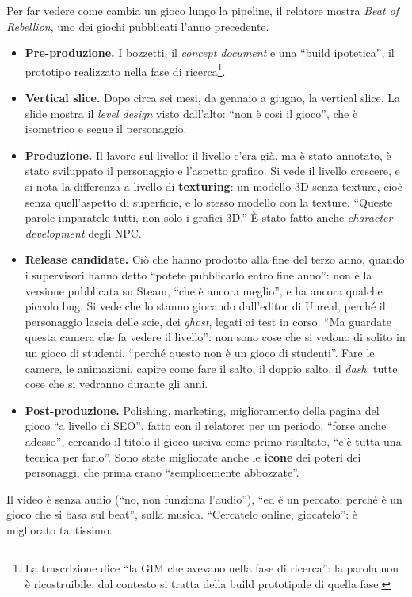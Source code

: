 Per far vedere come cambia un gioco lungo la pipeline, il relatore mostra
\emph{Beat of Rebellion}, uno dei giochi pubblicati l'anno precedente.
\begin{itemize}
  \item \textbf{Pre-produzione.} I bozzetti, il \emph{concept document} e
        una ``build ipotetica'', il prototipo realizzato nella fase di
        ricerca\footnote{La trascrizione dice ``la GIM che avevano nella fase
        di ricerca'': la parola non è ricostruibile; dal contesto si tratta
        della build prototipale di quella fase.}.
  \item \textbf{Vertical slice.} Dopo circa sei mesi, da gennaio a giugno,
        la vertical slice. La slide mostra il \emph{level design} visto
        dall'alto: ``non è così il gioco'', che è isometrico e segue il
        personaggio.
  \item \textbf{Produzione.} Il lavoro sul livello: il livello c'era già,
        ma è stato annotato, è stato sviluppato il personaggio e l'aspetto
        grafico. Si vede il livello crescere, e si nota la differenza a
        livello di \textbf{texturing}: un modello 3D senza texture, cioè
        senza quell'aspetto di superficie, e lo stesso modello con la
        texture. ``Queste parole imparatele tutti, non solo i grafici 3D.''
        È stato fatto anche \emph{character development} degli NPC.
  \item \textbf{Release candidate.} Ciò che hanno prodotto alla fine del
        terzo anno, quando i supervisori hanno detto ``potete pubblicarlo
        entro fine anno'': non è la versione pubblicata su Steam, ``che è
        ancora meglio'', e ha ancora qualche piccolo bug. Si vede che lo
        stanno giocando dall'editor di Unreal, perché il personaggio lascia
        delle scie, dei \emph{ghost}, legati ai test in corso. ``Ma guardate
        questa camera che fa vedere il livello'': non sono cose che si vedono
        di solito in un gioco di studenti, ``perché questo non è un gioco di
        studenti''. Fare le camere, le animazioni, capire come fare il salto,
        il doppio salto, il \emph{dash}: tutte cose che si vedranno durante
        gli anni.
  \item \textbf{Post-produzione.} Polishing, marketing, miglioramento della
        pagina del gioco ``a livello di SEO'', fatto con il relatore: per un
        periodo, ``forse anche adesso'', cercando il titolo il gioco usciva
        come primo risultato, ``c'è tutta una tecnica per farlo''. Sono
        state migliorate anche le \textbf{icone} dei poteri dei personaggi,
        che prima erano ``semplicemente abbozzate''.
\end{itemize}
Il video è senza audio (``no, non funziona l'audio''), ``ed è un peccato,
perché è un gioco che si basa sul beat'', sulla musica. ``Cercatelo online,
giocatelo'': è migliorato tantissimo.

